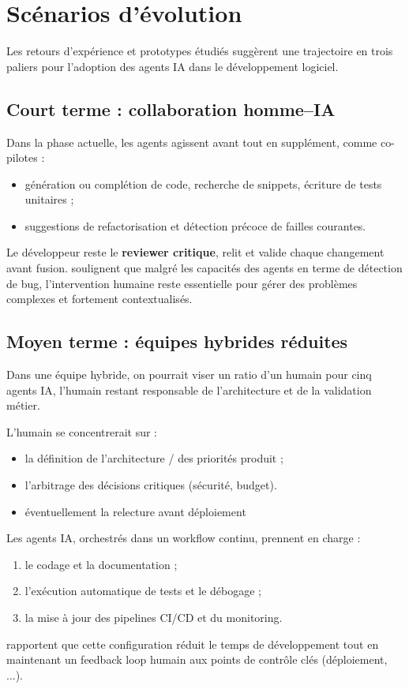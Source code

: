 \section{Scénarios d’évolution}

Les retours d’expérience et prototypes étudiés suggèrent une trajectoire en trois paliers pour l’adoption des agents IA dans le développement logiciel.

\subsection{Court terme : collaboration homme–IA}

Dans la phase actuelle, les agents agissent avant tout en supplément, comme co-pilotes :  
\begin{itemize}
  \item génération ou complétion de code, recherche de snippets, écriture de tests unitaires ;
  \item suggestions de refactorisation et détection précoce de failles courantes.  
\end{itemize}
Le développeur reste le \textbf{reviewer critique}, relit et valide chaque changement avant fusion.  
\textcite{zahid_multi-agent_2024} soulignent que malgré les capacités des agents en terme de détection de bug, l'intervention humaine reste essentielle pour gérer des problèmes complexes et fortement contextualisés.

\subsection{Moyen terme : équipes hybrides réduites}

Dans une équipe hybride, on pourrait viser un ratio d'un humain pour cinq agents IA, l’humain restant responsable de l’architecture et de la validation métier.
 
L’humain se concentrerait sur :
\begin{itemize}
  \item la définition de l’architecture / des priorités produit ;
  \item l’arbitrage des décisions critiques (sécurité, budget).  
  \item éventuellement la relecture avant déploiement
\end{itemize}
Les agents IA, orchestrés dans un workflow continu, prennent en charge :
\begin{enumerate}
  \item le codage et la documentation ;
  \item l’exécution automatique de tests et le débogage ;
  \item la mise à jour des pipelines CI/CD et du monitoring.  
\end{enumerate}
\textcite{khan_ai-driven_2025} rapportent que cette configuration réduit le temps de développement tout en maintenant un feedback loop humain aux points de contrôle clés (déploiement, ...).

